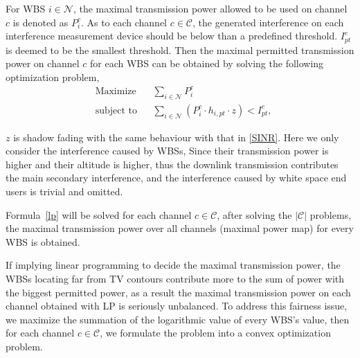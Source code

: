 For WBS $i\in \mathcal{N}$, the maximal transmission power allowed to be used on channel $c$ is denoted as $P_i^c$. 
As to each channel $c\in \mathcal{C}$, the generated interference on each interference measurement device should be below than a predefined threshold.
$I^c_{pt} $ is deemed to be the smallest threshold.
Then the maximal permitted transmission power on channel $c$ for each WBS can be obtained by solving the following optimization problem,
	\begin{equation}
\label{lp}
		\begin{aligned}
		& {\text{Maximize}}
		& & \sum_{i\in \mathcal{N}} P^c_i \\
		& \text{subject to}
		& & \sum_{i\in \mathcal{N}} (P^c_i \cdot h_{i,pt}\cdot z) < I^c_{pt}, 
		\end{aligned}
	\end{equation}

$z$ is shadow fading with the same behaviour with that in \ref{SINR}.
Here we only consider the interference caused by WBSs, Since their transmission power is higher and their altitude is higher\cite{multipleIntf_pimrc11}, thus the downlink transmission contributes the main secondary interference\cite{infmitigate07mobicom}, and the interference caused by white space end users is trivial and omitted. 

Formula~\ref{lp} will be solved for each channel $c\in \mathcal{C}$, 
after solving the $|\mathcal{C}|$ problems, the maximal transmission power over all channels (maximal power map) for every WBS is obtained.

If implying linear programming to decide the maximal transmission power, the WBSs locating far from TV contours contribute more to the sum of power with the biggest permitted power, as a result the maximal transmission power on each channel obtained with LP is seriously unbalanced.
To address this fairness issue, we maximize the summation of the logarithmic value of every WBS's value, then for each channel $c\in \mathcal{C}$, we formulate the problem into a convex optimization problem.

